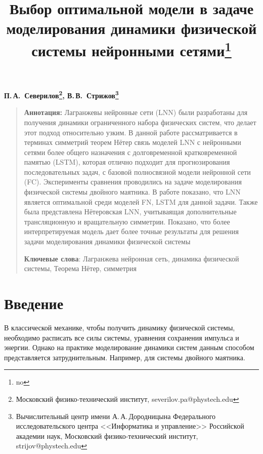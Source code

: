 \documentclass[12pt]{article}
\begin{document}
	\title{Выбор оптимальной модели в задаче моделирования динамики физической системы нейронными сетями\thanks{no}}
	\date{}
	\author{}
	\maketitle
	
	\begin{center}
		\bf
		П.\,А.~Северилов\footnote{Московский физико-технический институт, severilov.pa@phystech.edu}, 
		В.\,В.~Стрижов\footnote{Вычислительный центр имени А.\,А.\,Дородницына Федерального исследовательского центра <<Информатика и управление>> Российской академии наук, Московский физико-технический институт, strijov@phystech.edu}
	\end{center}
	{\begin{quote}
			\textbf{Аннотация:}
			Лагранжевы нейронные сети (LNN) были разработаны для получения динамики ограниченного набора физических систем, что делает этот подход относительно узким. В данной работе рассматривается в терминах симметрий теорем Нётер связь моделей LNN с нейронными сетями более общего назначения с долговременной кратковременной памятью (LSTM), которая отлично подходит для прогнозирования последовательных задач, с базовой полносвязной модели нейронной сети (FC). Эксперименты сравнения проводились на задаче моделирования физической системы двойного маятника. В работе показано, что LNN является оптимальной среди моделей FN, LSTM для данной задачи. Также была представлена Нётеровская LNN, учитываящая дополнительные трансляционную и вращательную симметрии. Показано, что более интерпретируемая модель дает более точные результаты для решения задачи моделирования динамики физической системы
			
			\smallskip
			\textbf{Ключевые слова}: Лагранжева нейронная сеть, динамика физической системы, Теорема Нётер, симметрия
			\smallskip
			
		\end{quote}
	}

	
	\section{Введение}
	
	
	В классической механике, чтобы получить динамику физической системы, необходимо расписать все силы системы, уравнения сохранения импульса и энергии. Однако на практике моделирование динамики систем данным способом представляется затруднительным. Например, для системы двойного маятника.
	
\end{document}

